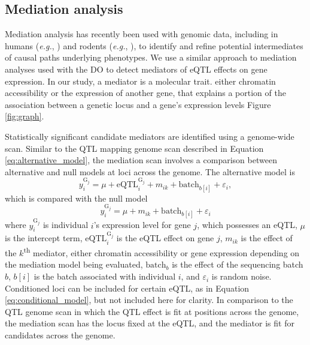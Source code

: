 \documentclass[9pt,twocolumn,twoside]{gsajnl}
\newcommand{\eg}{\emph{e.g.}\xspace}
\begin{document}
\subsection{Mediation analysis}

Mediation analysis has recently been used with genomic data, including in humans (\eg, \citealt{Battle2014}) and rodents (\eg, \citealt{Keele2018,Oreper2018}), to identify and refine potential intermediates of causal paths underlying phenotypes. We use a similar approach to mediation analyses used with the DO \citep{Chick2016, Keller2018} to detect mediators of eQTL effects on gene expression. In our study, a mediator is a molecular trait. either chromatin accessibility or the expression of another gene, that explains a portion of the association between a genetic locus and a gene's expression levels Figure \ref{fig:graph}.

Statistically significant candidate mediators are identified using a genome-wide scan. 
Similar to the QTL mapping genome scan described in Equation \ref{eq:alternative_model}, the mediation scan involves a comparison between alternative and null models at loci across the genome. The alternative model is
\begin{equation}
y^{\text{G}_{j}}_{i} = \mu + \text{eQTL}_{i}^{\text{G}_{j}} + m_{ik} + \text{batch}_{b[i]} + \varepsilon_{i},
\label{eq:mediation_alt}
\end{equation}
which is compared with the null model
\begin{equation}
y^{\text{G}_{j}}_{i} = \mu + m_{ik} \nonumber + \text{batch}_{b[i]} + \varepsilon_{i}
\label{eq:mediation_null}
\end{equation}
where $y^{\text{G}_{j}}_{i}$ is individual $i$'s expression level for gene $j$, which possesses an eQTL, $\mu$ is the intercept term, $\text{eQTL}_{i}^{\text{G}_{j}}$ is the eQTL effect on gene $j$, $m_{ik}$ is the effect of the $k$\textsuperscript{th} mediator, either chromatin accessibility or gene expression depending on the mediation model being evaluated, $\text{batch}_{b}$ is the effect of the sequencing batch $b$, $b[i]$ is the batch associated with individual $i$, and $\varepsilon_{i}$ is random noise. Conditioned loci can be included for certain eQTL, as in Equation \ref{eq:conditional_model}, but not included here for clarity. In comparison to the QTL genome scan in which the QTL effect is fit at positions across the genome, the mediation scan has the locus fixed at the eQTL, and the mediator is fit for candidates across the genome.
\end{document}
